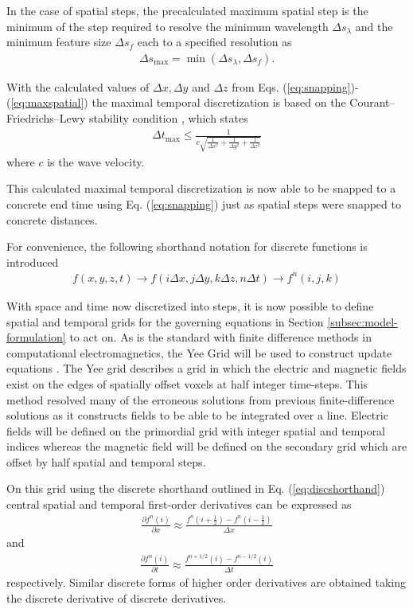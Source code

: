 In the case of spatial steps, the precalculated maximum spatial step is the minimum of the step required to resolve the minimum wavelength $\Delta s_\lambda$ and the minimum feature size $\Delta s_f$ each to a specified resolution as
\begin{align}
	\Delta s_{\max} = \min{(\Delta s_\lambda, \Delta s_f)}.
	\label{eq:maxspatial}
\end{align}

With the calculated values of $\Delta x, \Delta y$ and $\Delta z$ from Eqs. (\ref{eq:snapping})-(\ref{eq:maxspatial}) the maximal temporal discretization is based on the Courant–Friedrichs–Lewy stability condition \cite{jin2011theory}, which states
\begin{align}
	\Delta t_{\max} \leq \frac{1}{c\sqrt{\frac{1}{\Delta x^2}+\frac{1}{\Delta y^2}+\frac{1}{\Delta z^2}}}
\end{align}
where $c$ is the wave velocity.

This calculated maximal temporal discretization is now able to be snapped to a concrete end time using Eq. (\ref{eq:snapping}) just as spatial steps were snapped to concrete distances.

For convenience, the following shorthand notation for discrete functions is introduced
\begin{align}
	f(x,y,z,t)\rightarrow f(i\Delta x, j\Delta y, k\Delta z, n\Delta t)\rightarrow f^n(i,j,k)
	\label{eq:discshorthand}
\end{align}

With space and time now discretized into steps, it is now possible to define spatial and temporal grids for the governing equations in Section \ref{subsec:model-formulation} to act on. As is the standard with finite difference methods in computational electromagnetics, the Yee Grid will be used to construct update equations \cite{taftlovefdtd}. The Yee grid describes a grid in which the electric and magnetic fields exist on the edges of spatially offset voxels at half integer time-steps\cite{yee}. This method resolved many of the erroneous solutions from previous finite-difference solutions as it constructs fields to be able to be integrated over a line\cite{rothlecnotes}. Electric fields will be defined on the primordial grid with integer spatial and temporal indices whereas the magnetic field will be defined on the secondary grid which are offset by half spatial and temporal steps.

On this grid using the discrete shorthand outlined in Eq. (\ref{eq:discshorthand}) central spatial and temporal first-order derivatives can be expressed as
\begin{align}
	\frac{\partial f^n(i)}{\partial x} \approx \frac{f^n(i+\frac{1}{2})- f^n(i-\frac{1}{2})}{\Delta x}
\end{align}
and
\begin{align}
	\frac{\partial f^n(i)}{\partial t} \approx \frac{f^{n+1/2}(i)- f^{n-1/2}(i)}{\Delta t}
\end{align}
respectively. Similar discrete forms of higher order derivatives are obtained taking the discrete derivative of discrete derivatives.


